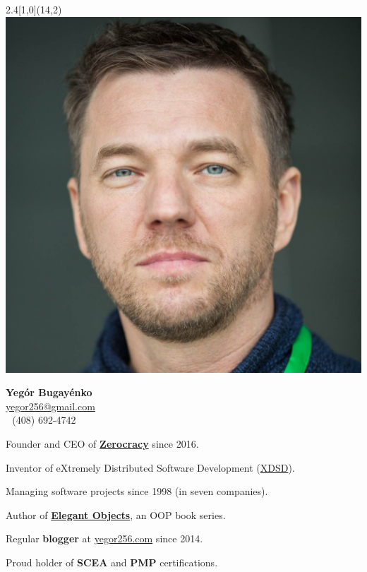 \documentclass[12pt]{article}
\begin{document}
\setlength{\topskip}{0mm}
\setlength{\parindent}{0pt}
\setlength{\parskip}{6pt}
\raggedright
\large
{}

\begin{textblock}{2.4}[1,0](14,2){
  \includegraphics[width=\textwidth]{../images/face-1200x1200.jpg}
}\end{textblock}

\textbf{\Large Yeg\'or Bugay\'enko}\\%
\href{mailto:yegor256@gmail.com}{yegor256@gmail.com}\\ %
(408) 692-4742

\vspace{1em}

Founder and CEO of \textbf{\href{https://www.zerocracy.com}{Zerocracy}} since 2016.

Inventor of eXtremely Distributed Software Development (\href{http://www.xdsd.org}{XDSD}).

Managing software projects since 1998 (in seven companies).

Author of \textbf{\href{http://www.yegor256.com/elegant-objects.html}{Elegant Objects}},
  an OOP book series.

Regular \textbf{blogger} at \href{http://www.yegor256.com/}{yegor256.com} since 2014.

Proud holder of \textbf{SCEA} and
  \textbf{PMP} certifications.
\end{document}
